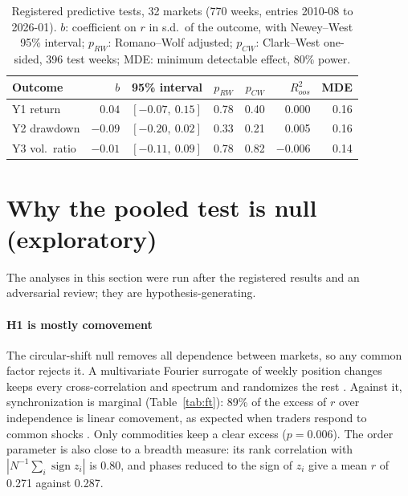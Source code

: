 \documentclass[preprint,12pt,authoryear]{elsarticle}
\begin{document}
\begin{table}[t]
\centering
\caption{Registered predictive tests, 32 markets (770 weeks, entries 2010-08
to 2026-01). $b$: coefficient on $r$ in s.d.\ of the outcome, with Newey--West
95\% interval; $p_{RW}$: Romano--Wolf adjusted; $p_{CW}$: Clark--West
one-sided, 396 test weeks; MDE: minimum detectable effect, 80\% power.}
\label{tab:h2}
\small
\begin{tabular}{lrrrrrr}
\toprule
Outcome & $b$ & 95\% interval & $p_{RW}$ & $p_{CW}$ & $R^2_{oos}$ & MDE \\
\midrule
Y1 return     & $0.04$ & $[-0.07,\ 0.15]$ & 0.78 & 0.40 & 0.000 & 0.16 \\
Y2 drawdown   & $-0.09$ & $[-0.20,\ 0.02]$ & 0.33 & 0.21 & 0.005 & 0.16 \\
Y3 vol.\ ratio & $-0.01$ & $[-0.11,\ 0.09]$ & 0.78 & 0.82 & $-0.006$ & 0.14 \\
\bottomrule
\end{tabular}
\end{table}

\section{Why the pooled test is null (exploratory)}

The analyses in this section were run after the registered results and an
adversarial review; they are hypothesis-generating.

\paragraph{H1 is mostly comovement} The circular-shift null removes all
dependence between markets, so any common factor rejects it. A multivariate
Fourier surrogate of weekly position changes keeps every cross-correlation
and spectrum and randomizes the rest \citep{PrichardTheiler1994}. Against it,
synchronization is marginal (Table~\ref{tab:ft}): 89\% of the excess of $r$
over independence is linear comovement, as expected when traders respond to
common shocks \citep{TeramaeTanaka2004}. Only commodities keep a clear excess
($p=0.006$). The order parameter is also close to a breadth measure: its rank
correlation with $|N^{-1}\sum_i \operatorname{sign} z_i|$ is 0.80, and phases
reduced to the sign of $z_i$ give a mean $r$ of 0.271 against 0.287.
\end{document}
